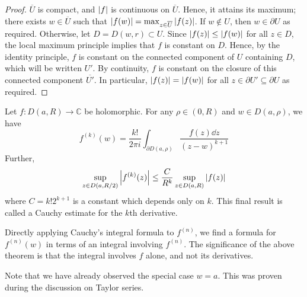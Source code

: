 \begin{proof}
	\( \overline U \) is compact, and \( \abs{f} \) is continuous on \( \overline U \).
	Hence, it attains its maximum; there exists \( w \in \overline U \) such that \( \abs{f(w)} = \max_{z \in \overline U} \abs{f(z)} \).
	If \( w \not\in U \), then \( w \in \partial U \) as required.
	Otherwise, let \( D = D(w,r) \subset U \).
	Since \( \abs{f(z)} \leq \abs{f(w)} \) for all \( z \in D \), the local maximum principle implies that \( f \) is constant on \( D \).
	Hence, by the identity principle, \( f \) is constant on the connected component of \( U \) containing \( D \), which will be written \( U' \).
	By continuity, \( f \) is constant on the closure of this connected component \( \overline{U'} \).
	In particular, \( \abs{f(z)} = \abs{f(w)} \) for all \( z \in \partial U' \subseteq \partial U \) as required.
\end{proof}
\begin{theorem}
	Let \( f \colon D(a,R) \to \mathbb C \) be holomorphic.
	For any \( \rho \in (0,R) \) and \( w \in D(a,\rho) \), we have
	\[ f^{(k)}(w) = \frac{k!}{2\pi i} \int_{\partial D(a,\rho)} \frac{f(z) \dd{z}}{(z-w)^{k+1}} \]
	Further,
	\[ \sup_{z \in D(a,R/2)} \abs{f^{(k)}(z)} \leq \frac{C}{R^k} \sup_{z \in D(a,R)} \abs{f(z)} \]
	where \( C = k! 2^{k+1} \) is a constant which depends only on \( k \).
	This final result is called a Cauchy estimate for the \( k \)th derivative.
\end{theorem}
\begin{remark}
	Directly applying Cauchy's integral formula to \( f^{(n)} \), we find a formula for \( f^{(n)}(w) \) in terms of an integral involving \( f^{(n)} \).
	The significance of the above theorem is that the integral involves \( f \) alone, and not its derivatives.

	Note that we have already observed the special case \( w = a \).
	This was proven during the discussion on Taylor series.
\end{remark}
